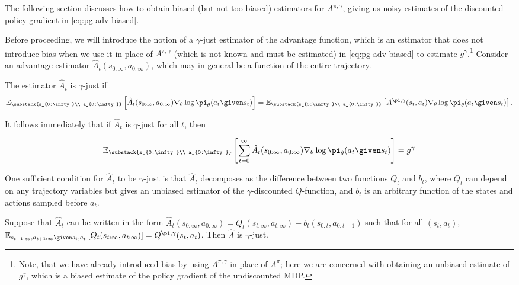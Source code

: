 The following section discusses how to obtain biased (but not too biased) estimators for $A^{\pi,\gamma}$, giving us noisy estimates of the discounted policy gradient in \ref{eq:pg-adv-biased}.

Before proceeding, we will introduce the notion of a $\gamma$-just estimator of the advantage function, which is an estimator that does not introduce bias when we use it in place of $A^{\pi,\gamma}$ (which is not known and must be estimated) in \ref{eq:pg-adv-biased} to estimate $g^{\gamma}$.\footnote{Note, that we have already introduced bias by using $A^{\pi,\gamma}$ in place of $\ensuremath{A^{\pi}}$; here we are concerned with obtaining an unbiased estimate of $g^{\gamma}$, which is a biased estimate of the policy gradient of the undiscounted MDP.} Consider an advantage estimator $\hat{A}_t(s_{0:\infty},a_{0:\infty})$, which may in general be a function of the entire trajectory.

\begin{defn}
The estimator $\hat{A}_t$ is $\gamma$-just if
\begin{align}
\mathbb{E}_{\substack{s_{0:\infty}\\ a_{0:\infty}}}\left[ \hat{A}_t(s_{0:\infty},a_{0:\infty}) \nabla_{\theta} \log \pi_{\theta}(a_t \given s_t)\right]
=
\mathbb{E}_{\substack{s_{0:\infty}\\ a_{0:\infty}}}\left[ A^{\pi,\gamma}(s_t,a_t) \nabla_{\theta} \log \pi_{\theta}(a_t \given s_t)\right].
\end{align}
\end{defn}

It follows immediately that if $\hat{A}_t$ is $\gamma$-just for all $t$, then

\begin{align}
\mathbb{E}_{\substack{s_{0:\infty}\\ a_{0:\infty}}}\left[ \sum_{t=0}^{\infty}\hat{A}_t(s_{0:\infty},a_{0:\infty}) \nabla_{\theta} \log \pi_{\theta}(a_t \given s_t)\right]
=
g^{\gamma}
\label{eq:ubgrad}
\end{align}

One sufficient condition for $\hat{A}_t$ to be $\gamma$-just is that $\hat{A}_t$ decomposes as the difference between two functions $Q_t$ and $b_t$, where $Q_t$ can depend on any trajectory variables but gives an unbiased estimator of the $\gamma$-discounted $Q$-function, and $b_t$ is an arbitrary function of the states and actions sampled before $a_t$.

\begin{prop} 
Suppose that $\hat{A}_t$ can be written in the form $\hat{A}_t(s_{0:\infty},a_{0:\infty}) = Q_t(s_{t:\infty},a_{t:\infty})-b_t(s_{0:t}, a_{0:t-1})$ such that for all $(s_t, a_t)$, $\mathbb{E}_{s_{t+1:\infty},a_{t+1:\infty} \given s_t,a_t}\left[Q_t(s_{t:\infty},a_{t:\infty})\right]=Q^{\pi,\gamma}(s_t, a_t)$. Then $\hat{A}$ is $\gamma$-just.
\end{prop}

